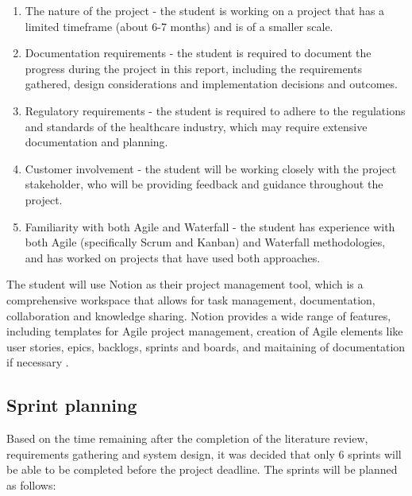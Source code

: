 \begin{enumerate}
    \item The nature of the project - the student is working on a project that has a limited timeframe (about 6-7 months) and is of a smaller scale. 
    \item Documentation requirements - the student is required to document the progress during the project in this report, including the requirements gathered, design considerations and implementation decisions and outcomes. 
    \item Regulatory requirements - the student is required to adhere to the regulations and standards of the healthcare industry, which may require extensive documentation and planning.
    \item Customer involvement - the student will be working closely with the project stakeholder, who will be providing feedback and guidance throughout the project.
    \item Familiarity with both Agile and Waterfall - the student has experience with both Agile (specifically Scrum and Kanban) and Waterfall methodologies, and has worked on projects that have used both approaches.
\end{enumerate}

The student will use Notion as their project management tool, which is a comprehensive workspace that allows for task management, documentation, collaboration and knowledge sharing. Notion provides a wide range of features, including templates for Agile project management, creation of Agile elements like user stories, epics, backlogs, sprints and boards, and maitaining of documentation if necessary \parencite{notion}. 

\subsection{Sprint planning}

Based on the time remaining after the completion of the literature review, requirements gathering and system design, it was decided that only 6 sprints will be able to be completed before the project deadline. The sprints will be planned as follows:

